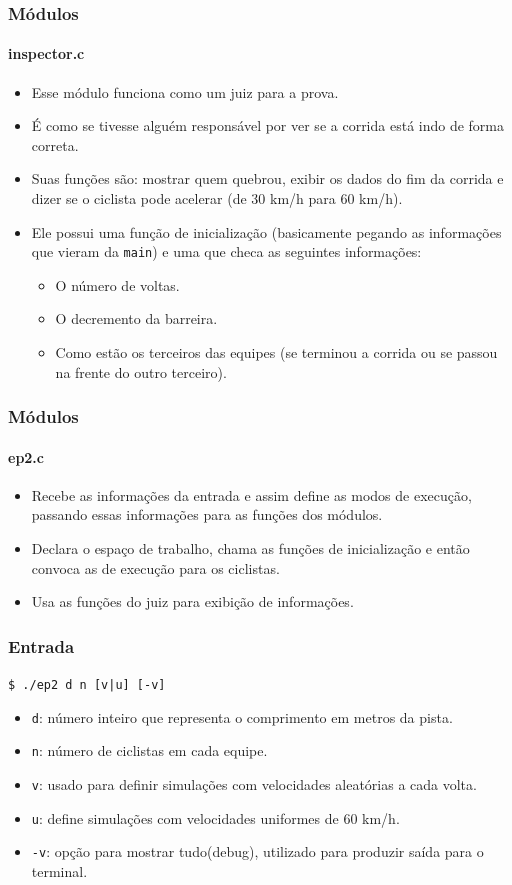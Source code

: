 \documentclass{beamer}
\begin{document}
\begin{frame}
	\frametitle{Módulos}
	\framesubtitle{inspector.c}
	\begin{itemize}
		\item Esse módulo funciona como um juiz para a prova.
		\item É como se tivesse alguém responsável por ver se a corrida está indo de forma correta.
		\item Suas funções são: mostrar quem quebrou, exibir os dados do fim da corrida e dizer se o ciclista pode acelerar (de 30 km/h para 60 km/h).
		\item Ele possui uma função de inicialização (basicamente pegando as informações que vieram da \texttt{main}) e uma que checa as seguintes informações:
		\begin{itemize}
			\item O número de voltas.
			\item O decremento da barreira.
			\item Como estão os terceiros das equipes (se terminou a corrida ou se passou na frente do outro terceiro).
		\end{itemize}
	\end{itemize}	
\end{frame}

\begin{frame}
	\frametitle{Módulos}
	\framesubtitle{ep2.c}
	\begin{itemize}
		\item Recebe as informações da entrada e assim define as modos de execução, passando essas informações para as funções dos módulos.
		\item Declara o espaço de trabalho, chama as funções de inicialização e então convoca as de execução para os ciclistas.
		\item Usa as funções do juiz para exibição de informações.
	\end{itemize}	
\end{frame}

\begin{frame}
	\frametitle{Entrada}
	\begin{center}
		\texttt{\$ ./ep2 d n [v|u] [-v]}
	\end{center}	
	\begin{itemize}
		\item \texttt{d}: número inteiro que representa o comprimento em metros da pista.
		\item \texttt{n}: número de ciclistas em cada equipe. 
		\item \texttt{v}: usado para definir simulações com velocidades aleatórias a cada volta. 
		\item \texttt{u}: define simulações com velocidades uniformes de 60 km/h.  
		\item \texttt{-v}: opção para mostrar tudo(debug), utilizado para produzir saída para o terminal. 
	\end{itemize} 
\end{frame}
\end{document}

